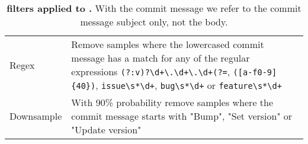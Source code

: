 \begin{table}[htbp]
\begin{tabular}{p{2cm} p{11cm}}
Regex & Remove samples where the lowercased commit message has a match for any of the regular expressions \verb/(?:v)?\d+\.\d+\.\d+(?=/, \verb/([a-f0-9]{40})/, \verb/issue\s*\d+/, \verb/bug\s*\d+/ or \verb/feature\s*\d+/ \\
Downsample & With 90\% probability remove samples where the commit message starts with "Bump", "Set version" or "Update version" \\
\bottomrule
\end{tabular}
\caption{\textbf{\dataft{} filters applied to \data{}.} With the commit message we refer to the commit message subject only, not the body.}
\label{tab:filterb}
\end{table}

\begin{table}[htbp]
\centering
\begin{tabular}{p{13cm}}
\toprule

\end{tabular}
\end{table}
